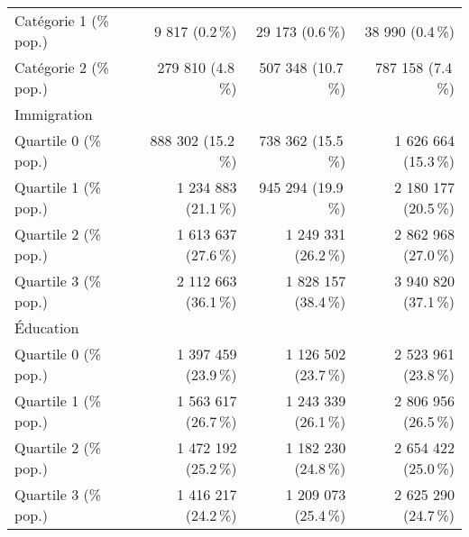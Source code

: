 \begin{longtable}{l|rrr}
\hspace*{25px} Catégorie 1 (\% pop.) & 9 817 (0.2\,\%) & 29 173 (0.6\,\%) & 38 990 (0.4\,\%) \\ 
\hspace*{25px} Catégorie 2 (\% pop.) & 279 810 (4.8\,\%) & 507 348 (10.7\,\%) & 787 158 (7.4\,\%) \\ 
\midrule
\multicolumn{4}{l}{Immigration} \\ 
\midrule
\hspace*{25px} Quartile 0 (\% pop.) & 888 302 (15.2\,\%) & 738 362 (15.5\,\%) & 1 626 664 (15.3\,\%) \\ 
\hspace*{25px} Quartile 1 (\% pop.) & 1 234 883 (21.1\,\%) & 945 294 (19.9\,\%) & 2 180 177 (20.5\,\%) \\ 
\hspace*{25px} Quartile 2 (\% pop.) & 1 613 637 (27.6\,\%) & 1 249 331 (26.2\,\%) & 2 862 968 (27.0\,\%) \\ 
\hspace*{25px} Quartile 3 (\% pop.) & 2 112 663 (36.1\,\%) & 1 828 157 (38.4\,\%) & 3 940 820 (37.1\,\%) \\ 
\midrule
\multicolumn{4}{l}{Éducation} \\ 
\midrule
\hspace*{25px} Quartile 0 (\% pop.) & 1 397 459 (23.9\,\%) & 1 126 502 (23.7\,\%) & 2 523 961 (23.8\,\%) \\ 
\hspace*{25px} Quartile 1 (\% pop.) & 1 563 617 (26.7\,\%) & 1 243 339 (26.1\,\%) & 2 806 956 (26.5\,\%) \\ 
\hspace*{25px} Quartile 2 (\% pop.) & 1 472 192 (25.2\,\%) & 1 182 230 (24.8\,\%) & 2 654 422 (25.0\,\%) \\ 
\hspace*{25px} Quartile 3 (\% pop.) & 1 416 217 (24.2\,\%) & 1 209 073 (25.4\,\%) & 2 625 290 (24.7\,\%) \\ 
\bottomrule
\end{longtable}

